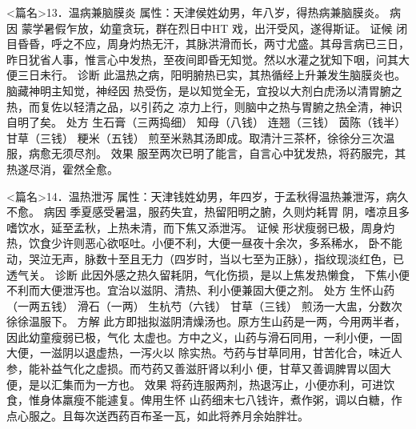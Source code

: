 \documentclass[a4paper,12pt,UTF8,twoside]{ctexbook}
\begin{document}
<篇名>13．温病兼脑膜炎
属性：天津侯姓幼男，年八岁，得热病兼脑膜炎。 
病因 蒙学暑假乍放，幼童贪玩，群在烈日中HT 戏，出汗受风，遂得斯证。 
证候 闭目昏昏，呼之不应，周身灼热无汗，其脉洪滑而长，两寸尤盛。其母言病已三日， 
昨日犹省人事，惟言心中发热，至夜间即昏无知觉。然以水灌之犹知下咽，问其大便三日未行。 
诊断 此温热之病，阳明腑热已实，其热循经上升兼发生脑膜炎也。脑藏神明主知觉，神经因 
热受伤，是以知觉全无，宜投以大剂白虎汤以清胃腑之热，而复佐以轻清之品，以引药之 
凉力上行，则脑中之热与胃腑之热全清，神识自明了矣。 
处方 生石膏（三两捣细） 知母（八钱） 连翘（三钱） 茵陈（钱半） 
甘草（三钱） 粳米（五钱） 
煎至米熟其汤即成。取清汁三茶杯，徐徐分三次温服，病愈无须尽剂。 
效果 服至两次已明了能言，自言心中犹发热，将药服完，其热遂尽消，霍然全愈。 


<篇名>14．温热泄泻
属性：天津钱姓幼男，年四岁，于孟秋得温热兼泄泻，病久不愈。 
病因 季夏感受暑温，服药失宜，热留阳明之腑，久则灼耗胃 
阴，嗜凉且多嗜饮水，延至孟秋，上热未清，而下焦又添泄泻。 
证候 形状瘦弱已极，周身灼热，饮食少许则恶心欲呕吐。小便不利，大便一昼夜十余次，多系稀水， 
卧不能动，哭泣无声，脉数十至且无力（四岁时，当以七至为正脉），指纹现淡红色，已透气关。 
诊断 此因外感之热久留耗阴，气化伤损，是以上焦发热懒食， 
下焦小便不利而大便泄泻也。宜治以滋阴、清热、利小便兼固大便之剂。 
处方 生怀山药（一两五钱） 滑石（一两） 生杭芍（六钱） 甘草（三钱） 
煎汤一大盅，分数次徐徐温服下。 
方解 此方即拙拟滋阴清燥汤也。原方生山药是一两，今用两半者，因此幼童瘦弱已极，气化 
太虚也。方中之义，山药与滑石同用，一利小便，一固大便，一滋阴以退虚热，一泻火以 
除实热。芍药与甘草同用，甘苦化合，味近人参，能补益气化之虚损。而芍药又善滋肝肾以利小 
便，甘草又善调脾胃以固大便，是以汇集而为一方也。 
效果 将药连服两剂，热退泻止，小便亦利，可进饮食，惟身体羸瘦不能遽复。俾用生怀 
山药细末七八钱许，煮作粥，调以白糖，作点心服之。且每次送西药百布圣一瓦，如此将养月余始胖壮。 
\end{document}
